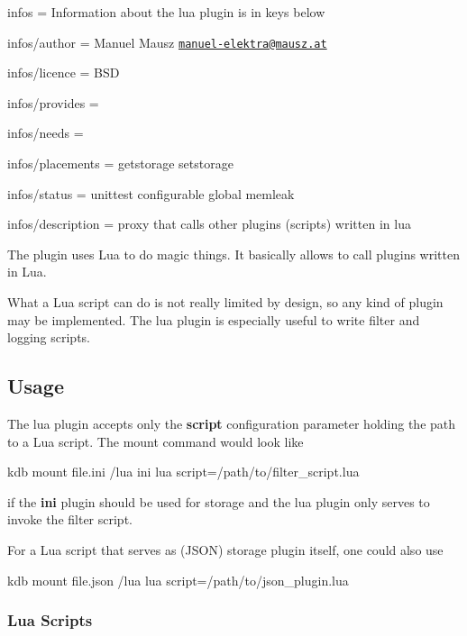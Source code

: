 
\begin{DoxyItemize}
\item infos = Information about the lua plugin is in keys below
\item infos/author = Manuel Mausz \href{mailto:manuel-elektra@mausz.at}{\tt manuel-\/elektra@mausz.\+at}
\item infos/licence = B\+SD
\item infos/provides =
\item infos/needs =
\item infos/placements = getstorage setstorage
\item infos/status = unittest configurable global memleak
\item infos/description = proxy that calls other plugins (scripts) written in lua
\end{DoxyItemize}

The plugin uses Lua to do magic things. It basically allows to call plugins written in Lua.

What a Lua script can do is not really limited by design, so any kind of plugin may be implemented. The lua plugin is especially useful to write filter and logging scripts.

\subsection*{Usage}

The lua plugin accepts only the {\bfseries script} configuration parameter holding the path to a Lua script. The mount command would look like


\begin{DoxyCode}
kdb mount file.ini /lua ini lua script=/path/to/filter\_script.lua
\end{DoxyCode}


if the {\bfseries ini} plugin should be used for storage and the lua plugin only serves to invoke the filter script.

For a Lua script that serves as (J\+S\+ON) storage plugin itself, one could also use


\begin{DoxyCode}
kdb mount file.json /lua lua script=/path/to/json\_plugin.lua
\end{DoxyCode}


\subsubsection*{Lua Scripts}

